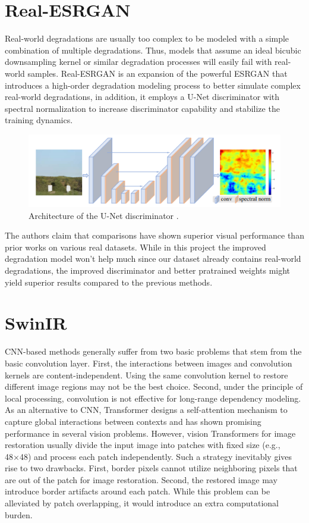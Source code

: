 \section{Real-ESRGAN}
\label{subsec:realesrgan}

Real-world degradations are usually too complex to be modeled with a simple combination of multiple degradations. Thus, models that assume an ideal bicubic
downsampling kernel or similar degradation processes will easily fail with real-world samples. Real-ESRGAN \cite{9711325} is an expansion of the powerful ESRGAN that introduces a high-order degradation modeling process to better simulate complex real-world degradations, in addition,
it employs a U-Net discriminator with spectral normalization to increase discriminator capability and stabilize the training dynamics.

\begin{figure}[H]
  \centering
  \includegraphics[scale=0.4]{figures/UNET.png}
  \caption{Architecture of the U-Net discriminator \cite{wang2021realesrgan}.}
  \label{img:UNET}
\end{figure}

The authors claim that comparisons have shown superior visual performance than prior works on various real datasets. While in this project the improved degradation model won't help much since our dataset already contains real-world degradations, the improved discriminator and better pratrained weights might yield superior results compared to the previous methods.

\section{SwinIR}
\label{subsec:swinir}

CNN-based methods generally suffer from two basic
problems that stem from the basic convolution layer. First, the interactions between images and convolution kernels are content-independent. Using the same convolution kernel to restore different image regions may not be the best choice. Second, under the principle of local processing, convolution is not effective for long-range dependency modeling. As an alternative to CNN, Transformer designs a self-attention mechanism to capture global interactions between contexts and has shown promising performance in several vision problems. However, vision Transformers for image restoration usually divide the input image into patches with fixed size (e.g., 48×48) and process each patch independently. Such a strategy inevitably gives rise to two drawbacks. First, border pixels cannot utilize neighboring pixels that are out of the patch for image restoration. Second, the restored image may introduce border artifacts around each patch. While this problem can be alleviated by patch overlapping, it would introduce an extra computational burden.

